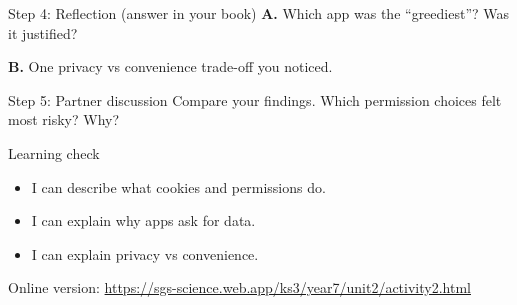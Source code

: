 \documentclass[10pt,a4paper]{article}
\begin{document}
\begin{StepBox}{Step 4: Reflection (answer in your book)}
\textbf{A.} Which app was the ``greediest''? Was it justified?\par
\textbf{B.} One privacy vs convenience trade-off you noticed.
\end{StepBox}

\begin{StepBox}{Step 5: Partner discussion}
Compare your findings. Which permission choices felt most risky? Why?
\end{StepBox}

\begin{InfoBox}{Learning check}
\begin{itemize}[leftmargin=*,label=$\square$,nosep]
  \item I can describe what cookies and permissions do.
  \item I can explain why apps ask for data.
  \item I can explain privacy vs convenience.
\end{itemize}
\end{InfoBox}

{\small\color{sgsGrey}Online version: \url{https://sgs-science.web.app/ks3/year7/unit2/activity2.html}}
\end{document}
